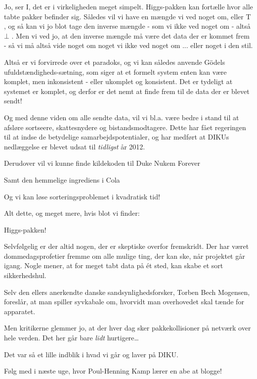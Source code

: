 \documentclass[a4paper,11pt]{article}
\begin{document}
\begin{sketch}
 Jo, ser I, det er i virkeligheden meget simpelt. Higgs-pakken kan fortælle hvor alle tabte pakker befinder sig. Således vil vi have en mængde vi ved noget om, eller T , og så kan vi jo blot tage den inverse mængde - som vi ikke ved noget om - altså $\bot$ . Men vi ved jo, at den inverse mængde må være det data der er kommet frem - så vi må altså vide noget om noget vi ikke ved noget om ... eller noget i den stil.

Altså er vi forvirrede over et paradoks, og vi kan således anvende Gödels ufuldstændigheds-sætning, som siger at et formelt system enten kan være komplet, men inkonsistent - eller ukomplet og konsistent. Det er tydeligt at systemet er komplet, og derfor er det nemt at finde frem til de data der er blevet sendt!

 Og med denne viden om alle sendte data, vil vi bl.a. være bedre i stand til at afsløre sortseere, skattesnydere og bistandsmodtagere. Dette har fået regeringen til at indse de betydelige samarbejdspotentialer, og har medført at DIKUs nedlæggelse er blevet udsat til \emph{tidligst} år 2012.

 Derudover vil vi kunne finde kildekoden til Duke Nukem Forever 

 Samt den hemmelige ingrediens i Cola 

 Og vi kan løse sorteringsproblemet i kvadratisk tid!

 Alt dette, og meget mere, hvis blot vi finder:

 Higgs-pakken! 

 Selvfølgelig er der altid nogen, der er skeptiske overfor fremskridt. Der har 
været dommedagsprofetier fremme om alle mulige ting, der kan ske, når projektet går 
igang. Nogle mener, at for meget tabt data på ét sted, kan skabe et sort sikkerhedshul.

 Selv den ellers anerkendte danske sandsynlighedsforsker, Torben Bech Mogensen, foreslår, at man spiller 
syvkabale om, hvorvidt man overhovedet skal tænde for apparatet.

 Men kritikerne glemmer jo, at der hver dag sker pakkekollisioner på netværk 
over hele verden. Det her går bare \emph{lidt} hurtigere\ldots

 Det var så et lille indblik i hvad vi går og laver på DIKU.

 Følg med i næste uge, hvor Poul-Henning Kamp lærer en abe at blogge!



\end{sketch}
\end{document}
